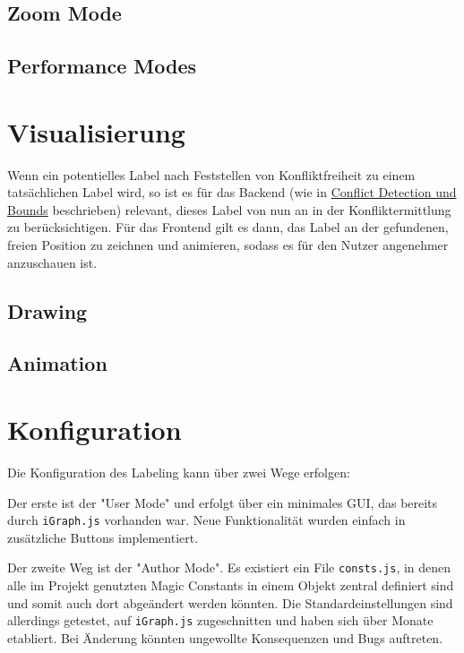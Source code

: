 \documentclass[final,nopreprintline]{elsarticle}
\begin{document}
\subsection{Zoom Mode}
\label{subsec:zoom}
    

\subsection{Performance Modes}
\label{subsec:perf}
    


\section{Visualisierung}
\label{sec:visualization}
Wenn ein potentielles Label nach Feststellen von Konfliktfreiheit zu einem tatsächlichen Label wird, so ist es für das Backend (wie in \hyperref[sec:conflict]{Conflict Detection und Bounds} beschrieben) relevant, dieses Label von nun an in der Konfliktermittlung zu berücksichtigen.
Für das Frontend gilt es dann, das Label an der gefundenen, freien Position zu zeichnen und animieren, sodass es für den Nutzer angenehmer anzuschauen ist.


\subsection{Drawing}
\label{subsec:draw}
    

\subsection{Animation}
\label{subsec:animate}
    


\section{Konfiguration}
\label{sec:configuration}

Die Konfiguration des Labeling kann über zwei Wege erfolgen:

Der erste ist der "User Mode" und erfolgt über ein minimales GUI, das bereits durch \texttt{iGraph.js} vorhanden war.
Neue Funktionalität wurden einfach in zusätzliche Buttons implementiert.

Der zweite Weg ist der "Author Mode". Es existiert ein File \texttt{consts.js}, in denen alle im Projekt
genutzten Magic Constants in einem Objekt zentral definiert sind und somit auch dort abgeändert werden könnten.
Die Standardeinstellungen sind allerdings getestet, auf \texttt{iGraph.js} zugeschnitten und haben sich über Monate etabliert.
Bei Änderung könnten ungewollte Konsequenzen und Bugs auftreten.
\end{document}
